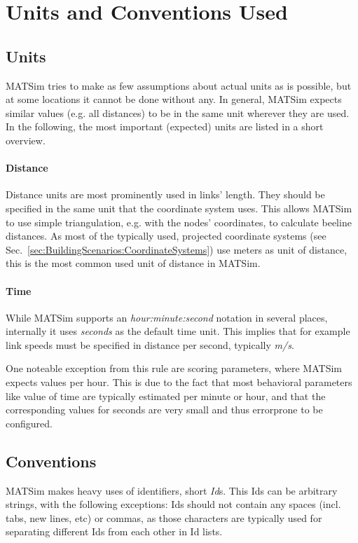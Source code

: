 \section{Units and Conventions Used}
\label{sec:BuildingScenarios:Units}

\subsection{Units}
MATSim tries to make as few assumptions about actual units as is possible,
but at some locations it cannot be done without any. In general, MATSim expects
similar values (e.g. all distances) to be in the same unit wherever they are
used. In the following, the most important (expected) units are listed in a 
short overview.

\paragraph{Distance} Distance units are most prominently used in links' length.
They should be specified in the same unit that the coordinate system uses. This
allows MATSim to use simple triangulation, e.g. with the nodes' coordinates,
to calculate beeline distances. As most of the typically used, projected 
coordinate systems (see Sec.~\ref{sec:BuildingScenarios:CoordinateSystems})
use meters as unit of distance, this is the most common used unit of distance
in MATSim.

\paragraph{Time} While MATSim supports an \emph{hour:minute:second} notation
in several places, internally it uses \emph{seconds} as the default time unit.
This implies that for example link speeds must be specified in distance per 
second, typically \emph{m/s}.

One noteable exception from this rule are scoring parameters, where MATSim
expects values per hour. This is due to the fact that most behavioral parameters
like value of time are typically estimated per minute or hour, and that the 
corresponding values for seconds are very small and thus errorprone to be
configured.


\subsection{Conventions}

MATSim makes heavy uses of identifiers, short \emph{Id}s. This Ids can be
arbitrary strings, with the following exceptions: Ids should not contain
any spaces (incl. tabs, new lines, etc) or commas, as those characters
are typically used for separating different Ids from each other in Id lists.


